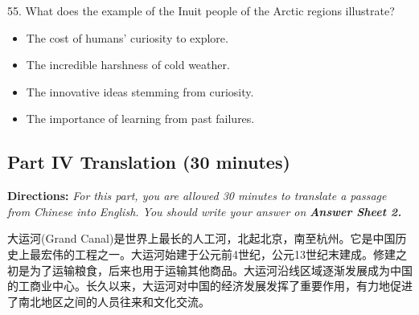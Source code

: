 \documentclass[UTF8,11pt]{ctexart}
\begin{document}
55. What does the example of the Inuit people of the Arctic regions illustrate?


\begin{itemize}[leftmargin=2em,itemsep=.2em,topsep=.4em]\item[A.] The cost of humans' curiosity to explore.
\item[B.] The incredible harshness of cold weather.
\item[C.] The innovative ideas stemming from curiosity.
\item[D.] The importance of learning from past failures.
\end{itemize}

\subsection*{\textbf{Part IV} \textbf{Translation} \textbf{(30 minutes)}}


\textbf{Directions: }\textit{For this part, you are allowed 30 minutes to translate a passage from Chinese into} \textit{English. You should write your answer on }\textbf{\textit{Answer Sheet 2.}}


大运河(Grand Canal)是世界上最长的人工河，北起北京，南至杭州。它是中国历史上最宏伟的工程之一。大运河始建于公元前4世纪，公元13世纪末建成。修建之初是为了运输粮食，后来也用于运输其他商品。大运河沿线区域逐渐发展成为中国的工商业中心。长久以来，大运河对中国的经济发展发挥了重要作用，有力地促进了南北地区之间的人员往来和文化交流。
\end{document}
